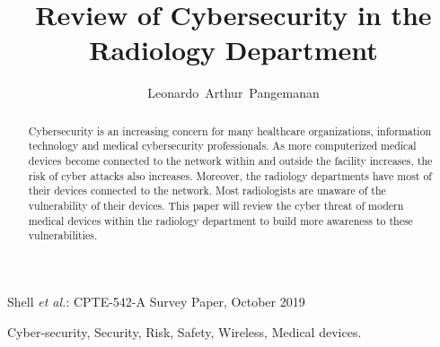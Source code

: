 \documentclass{IEEEtran}
\begin{document}
%
\title{Review of Cybersecurity in the Radiology Department}


\author{Leonardo~Arthur~Pangemanan}%




%
{Shell \MakeLowercase{\textit{et al.}}: CPTE-542-A Survey Paper, October 2019}

\maketitle

\begin{abstract}
	Cybersecurity is an increasing concern for many healthcare organizations, information technology and medical cybersecurity professionals. As more computerized medical devices become connected to the network within and outside the facility increases, the risk of cyber attacks also increases. Moreover, the radiology departments have most of their devices connected to the network. Most radiologists are unaware of the vulnerability of their devices. This paper will review the cyber threat of modern medical devices within the radiology department to build more awareness to these vulnerabilities.
\end{abstract}

\begin{IEEEkeywords}
Cyber-security, Security, Risk, Safety, Wireless, Medical devices.
\end{IEEEkeywords}
\end{document}
